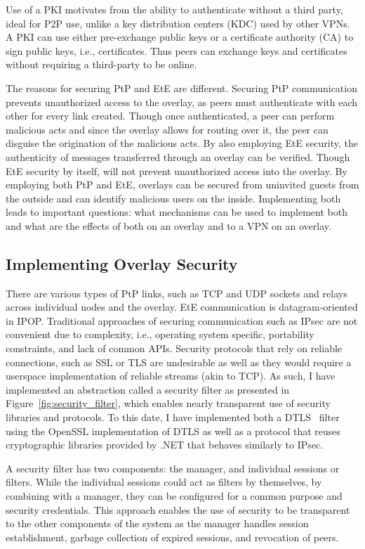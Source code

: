 Use of a PKI motivates from the ability to authenticate without a third party,
ideal for P2P use, unlike a key distribution centers (KDC) used by other VPNs.
A PKI can use either pre-exchange public keys or a certificate authority (CA)
to sign public keys, i.e., certificates.  Thus peers can exchange keys and
certificates without requiring a third-party to be online.

The reasons for securing PtP and EtE are different.  Securing PtP communication
prevents unauthorized access to the overlay, as peers must authenticate with
each other for every link created.  Though once authenticated, a peer can
perform malicious acts and since the overlay allows for routing over it, the
peer can disguise the origination of the malicious acts.  By also employing EtE
security, the authenticity of messages transferred through an overlay can be
verified.  Though EtE security by itself, will not prevent unauthorized access
into the overlay.  By employing both PtP and EtE, overlays can be secured from
uninvited guests from the outside and can identify malicious users on the
inside.  Implementing both leads to important questions: what mechanisms can be
used to implement both and what are the effects of both on an overlay and to a
VPN on an overlay.

\subsection{Implementing Overlay Security}

There are various types of PtP links, such as TCP and UDP sockets and relays
across individual nodes and the overlay.  EtE communication is
datagram-oriented in IPOP.  Traditional approaches of securing communication
such as IPsec are not convenient due to complexity, i.e., operating system
specific, portability constraints, and lack of common APIs.  Security protocols
that rely on reliable connections, such as SSL or TLS are undesirable as well
as they would require a userspace implementation of reliable streams (akin to
TCP).  As such, I have implemented an abstraction called a security filter as
presented in Figure~\ref{fig:security_filter}, which enables nearly transparent
use of security libraries and protocols.  To this date, I have implemented both
a DTLS~\cite{dtls} filter using the OpenSSL implementation of DTLS as well as a
protocol that reuses cryptographic libraries provided by .NET that behaves
similarly to IPsec.

A security filter has two components: the manager, and individual sessions or
filters.  While the individual sessions could act as filters by themselves, by
combining with a manager, they can be configured for a common purpose and
security credentials.  This approach enables the use of security to be
transparent to the other components of the system as the manager handles
session establishment, garbage collection of expired sessions, and revocation
of peers.

